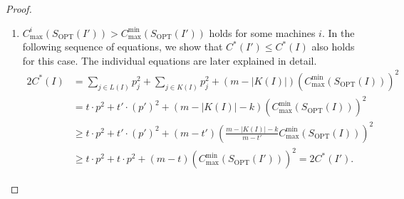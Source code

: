 \documentclass[11pt]{article}
\newcommand{\OPT}{\mathrm{OPT}}
\newcommand{\Cmin}{C_{\max}^{\min}}
\begin{document}
\begin{proof}
\begin{enumerate}[label=(\arabic*)]
Remember that any list schedule $\sigma(I')$ is optimal if
$C_{\max}^i(\sigma(I'))=\Cmin(\sigma(I'))$ holds for all machines $i$ due to the
convexity of the square function. Furthermore, the transformation does not
change $\sum_{i=1}^m C_{\max}^i(\sigma(I))$ for any list schedule $\sigma(I)$.
Therefore, Eqs.~(2) and (5) yield together with the convexity of the square
function:
\[
\begin{aligned}
        2C^*(I)
        &=
        \sum_{j\in L(I)}p_j^2
        +
        \sum_{i=1}^m(C_{\max}^i(S_{\OPT}(I)))^2                 \\
        &=
        t\cdot p^2
        +
        \sum_{i=1}^m(C_{\max}^i(S_{\OPT}(I)))^2                 \\
        &\geq
        t\cdot p^2
        +
        m(\Cmin(S_{\OPT}(I')))^2
        =
        2C^*(I').
\end{aligned}
\]

\item
$C_{\max}^i(S_{\OPT}(I'))>\Cmin(S_{\OPT}(I'))$ holds for some machines $i$.
In the following sequence of equations, we show that $C^*(I')\leq C^*(I)$
also holds for this case. The individual equations are later explained in
detail.
\begin{align}
        2C^*(I)
        &=
        \sum_{j\in L(I)}p_j^2
        +
        \sum_{j\in K(I)}p_j^2
        +
        (m-|K(I)|)(\Cmin(S_{\OPT}(I)))^2                         \tag{7}\\
        &=
        t\cdot p^2+t'\cdot(p')^2
        +(m-|K(I)|-k)(\Cmin(S_{\OPT}(I)))^2                      \tag{8}\\
        &\geq
        t\cdot p^2+t'\cdot(p')^2
        +(m-t')
        \left(
            \frac{m-|K(I)|-k}{m-t'}\Cmin(S_{\OPT}(I))
        \right)^2                                                \tag{9}\\
        &\geq
        t\cdot p^2+t\cdot p^2
        +(m-t)(\Cmin(S_{\OPT}(I')))^2
        =
        2C^*(I').                                                \tag{10}
\end{align}


\end{enumerate}
\end{proof}
\end{document}
